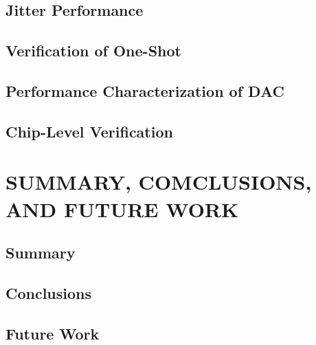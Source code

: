 \documentclass[12pt,oneside,final]{siuethesis}
\theoremstyle{definition}
\begin{document}
\section{Jitter Performance}

\section{Verification of One-Shot}

\section{Performance Characterization of DAC}

\section{Chip-Level Verification}




\chapter{SUMMARY, COMCLUSIONS, AND FUTURE WORK}

\section{Summary}


\section{Conclusions}

\section{Future Work}







\end{document}
